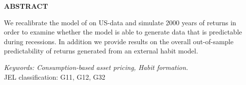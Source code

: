 \bigskip

\centerline{\bf ABSTRACT}

\begin{doublespace}  %
  \noindent We recalibrate the model of \citet{Campbell1999} on US-data and simulate 2000 years of returns in order to examine whether the model is able to generate data that is predictable during recessions. In addition we provide results on the overall out-of-sample predictability of returns generated from an external habit model.
\end{doublespace}

\medskip

\noindent \textit{Keywords: Consumption-based asset pricing, Habit formation.} \\

\noindent JEL classification: G11, G12, G32

           
  